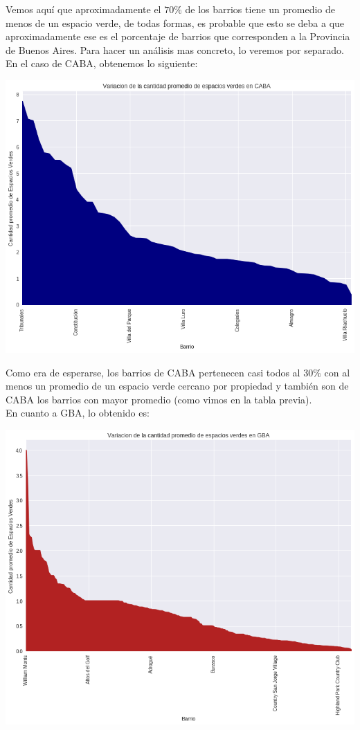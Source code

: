 \documentclass[a4paper, 10pt]{article}
\newcommand\tab[1][0.5cm]{\hspace*{#1}}
\begin{document}
				\tab Vemos aquí que aproximadamente el $70\%$ de los barrios tiene un promedio de menos de un espacio verde, de todas
				formas, es probable que esto se deba a que aproximadamente ese es el porcentaje de barrios que corresponden a la
				Provincia de Buenos Aires. Para hacer un análisis mas concreto, lo veremos por separado. \\
				\tab En el caso de CABA, obtenemos lo siguiente:
				\begin{center}
					\includegraphics[width=\textwidth]{images/parksVariationCABA}
				\end{center}
				\tab Como era de esperarse, los barrios de CABA pertenecen casi todos al $30\%$ con al menos un promedio de un
				espacio verde cercano por propiedad y también son de CABA los barrios con mayor promedio (como vimos en la tabla
				previa). \\
				\tab En cuanto a GBA, lo obtenido es:
				\begin{center}
					\includegraphics[width=\textwidth]{images/parksVariationGBA}
				\end{center}
\end{document}
